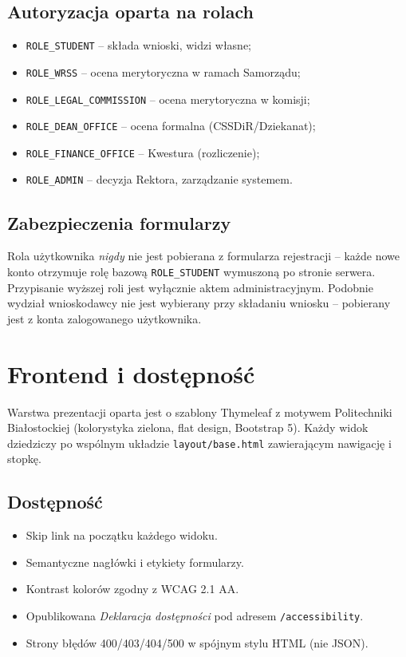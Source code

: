 \documentclass[12pt,a4paper]{article}
\begin{document}
\subsection{Autoryzacja oparta na rolach}
\begin{itemize}[leftmargin=*]
  \item \texttt{ROLE\_STUDENT} -- składa wnioski, widzi własne;
  \item \texttt{ROLE\_WRSS} -- ocena merytoryczna w ramach Samorządu;
  \item \texttt{ROLE\_LEGAL\_COMMISSION} -- ocena merytoryczna w komisji;
  \item \texttt{ROLE\_DEAN\_OFFICE} -- ocena formalna (CSSDiR/Dziekanat);
  \item \texttt{ROLE\_FINANCE\_OFFICE} -- Kwestura (rozliczenie);
  \item \texttt{ROLE\_ADMIN} -- decyzja Rektora, zarządzanie systemem.
\end{itemize}

\subsection{Zabezpieczenia formularzy}
Rola użytkownika \emph{nigdy} nie jest pobierana z formularza rejestracji --
każde nowe konto otrzymuje rolę bazową \texttt{ROLE\_STUDENT} wymuszoną po stronie
serwera. Przypisanie wyższej roli jest wyłącznie aktem administracyjnym.
Podobnie wydział wnioskodawcy nie jest wybierany przy składaniu wniosku --
pobierany jest z konta zalogowanego użytkownika.

\section{Frontend i dostępność}
\label{sec:front}

Warstwa prezentacji oparta jest o szablony Thymeleaf z motywem Politechniki
Białostockiej (kolorystyka zielona, flat design, Bootstrap 5). Każdy widok
dziedziczy po wspólnym układzie \texttt{layout/base.html} zawierającym nawigację
i stopkę.

\subsection{Dostępność}
\begin{itemize}[leftmargin=*]
  \item Skip link na początku każdego widoku.
  \item Semantyczne nagłówki i etykiety formularzy.
  \item Kontrast kolorów zgodny z WCAG 2.1 AA.
  \item Opublikowana \emph{Deklaracja dostępności} pod adresem \texttt{/accessibility}.
  \item Strony błędów 400/403/404/500 w spójnym stylu HTML (nie JSON).
\end{itemize}
\end{document}
